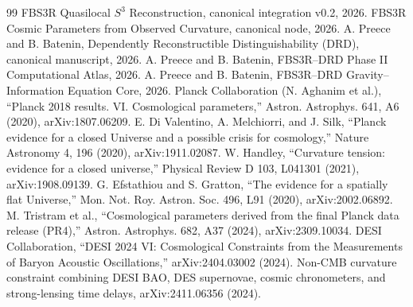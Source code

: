 \documentclass[11pt,a4paper]{article}
\begin{document}
\begin{thebibliography}{99}
 FBS3R Quasilocal $S^3$ Reconstruction, canonical integration v0.2, 2026.
 FBS3R Cosmic Parameters from Observed Curvature, canonical node, 2026.
 A. Preece and B. Batenin, Dependently Reconstructible Distinguishability (DRD), canonical manuscript, 2026.
 A. Preece and B. Batenin, FBS3R--DRD Phase II Computational Atlas, 2026.
 A. Preece and B. Batenin, FBS3R--DRD Gravity--Information Equation Core, 2026.
 Planck Collaboration (N. Aghanim et al.), ``Planck 2018 results. VI. Cosmological parameters,'' Astron. Astrophys. 641, A6 (2020), arXiv:1807.06209.
 E. Di Valentino, A. Melchiorri, and J. Silk, ``Planck evidence for a closed Universe and a possible crisis for cosmology,'' Nature Astronomy 4, 196 (2020), arXiv:1911.02087.
 W. Handley, ``Curvature tension: evidence for a closed universe,'' Physical Review D 103, L041301 (2021), arXiv:1908.09139.
 G. Efstathiou and S. Gratton, ``The evidence for a spatially flat Universe,'' Mon. Not. Roy. Astron. Soc. 496, L91 (2020), arXiv:2002.06892.
 M. Tristram et al., ``Cosmological parameters derived from the final Planck data release (PR4),'' Astron. Astrophys. 682, A37 (2024), arXiv:2309.10034.
 DESI Collaboration, ``DESI 2024 VI: Cosmological Constraints from the Measurements of Baryon Acoustic Oscillations,'' arXiv:2404.03002 (2024).
 Non-CMB curvature constraint combining DESI BAO, DES supernovae, cosmic chronometers, and strong-lensing time delays, arXiv:2411.06356 (2024).
\end{thebibliography}
\end{document}
